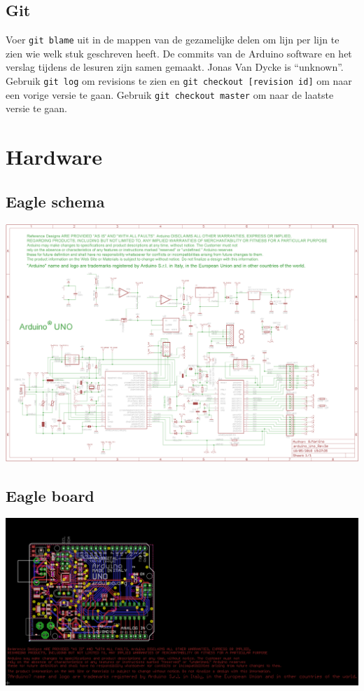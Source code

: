 \documentclass[a4paper]{report}
\newcommand{\code}[1]{\colorbox{light-gray}{\texttt{#1}}}
\begin{document}
    \section{Git}
        Voer \code{git blame} uit in de mappen van de gezamelijke delen om lijn per lijn te zien wie welk stuk geschreven heeft.
        De commits van de Arduino software en het verslag tijdens de lesuren zijn samen gemaakt.
        Jonas Van Dycke is ``unknown''.
        Gebruik \code{git log} om revisions te zien en \code{git checkout [revision id]} om naar een vorige versie te gaan.
        Gebruik \code{git checkout master} om naar de laatste versie te gaan.
        
\chapter{Hardware}
    \section{Eagle schema}
        \includegraphics[width=\textwidth]{ArduinoUno_Schema}
        
    \section{Eagle board}
        \includegraphics[width=\textwidth]{ArduinoUno_Board}
        
\end{document}
